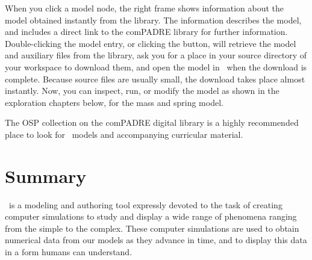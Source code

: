 When you click a model node, the right frame shows information about the model obtained instantly from the library. The information describes the model, and includes a direct link to the comPADRE library for further information. Double-clicking the model entry, or clicking the  button, will retrieve the model and auxiliary files from the library, ask you for a place in your source directory of your workspace to download them, and open the model in \ejs\ when the download is complete. Because source files are usually small, the download takes place almost instantly. Now, you can inspect, run, or modify the model as shown in the exploration chapters below, for the mass and spring model.

The OSP collection on the comPADRE digital library is a highly recommended place to look for \ejs\ models and accompanying curricular material. 

\section{Summary}\label{section:02Review}

\Ejs\ is a modeling and authoring tool expressly devoted to the task of creating computer simulations to study and display a wide range
of phenomena ranging from the simple to the complex. These computer simulations are used to obtain numerical data from our models as they advance in time, and to display this data in a form humans can understand.

